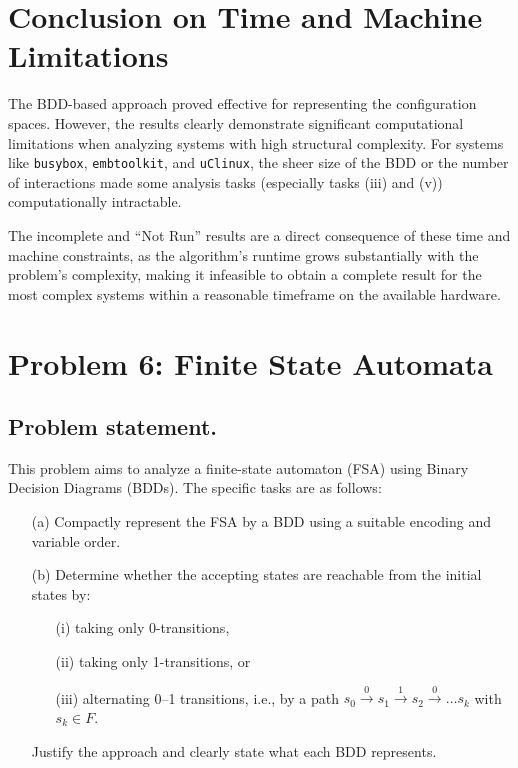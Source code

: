 \documentclass{article}
\begin{document}
\section{Conclusion on Time and Machine Limitations}
The BDD-based approach proved effective for representing the configuration spaces. However, the results clearly demonstrate significant computational limitations when analyzing systems with high structural complexity. For systems like \texttt{busybox}, \texttt{embtoolkit}, and \texttt{uClinux}, the sheer size of the BDD or the number of interactions made some analysis tasks (especially tasks (iii) and (v)) computationally intractable. 

The incomplete and ``Not Run'' results are a direct consequence of these time and machine constraints, as the algorithm's runtime grows substantially with the problem's complexity, making it infeasible to obtain a complete result for the most complex systems within a reasonable timeframe on the available hardware.


\section*{Problem 6: Finite State Automata}
\setcounter{section}{0}

\subsection* {Problem statement.}
This problem aims to analyze a finite-state automaton (FSA)
using Binary Decision Diagrams (BDDs).
The specific tasks are as follows:

\begin{enumerate}
  \item[(a)] Compactly represent the FSA by a BDD using a suitable encoding and variable order.
  \item[(b)] Determine whether the accepting states are reachable from the initial states by:
  \begin{itemize}
    \item[(i)] taking only 0-transitions,
    \item[(ii)] taking only 1-transitions, or
    \item[(iii)] alternating 0–1 transitions, i.e., by a path 
    \(s_0 \xrightarrow{0} s_1 \xrightarrow{1} s_2 \xrightarrow{0} \dots s_k \)
    with \(s_k \in F\).
  \end{itemize}
  Justify the approach and clearly state what each BDD represents.
\end{enumerate}
\end{document}
